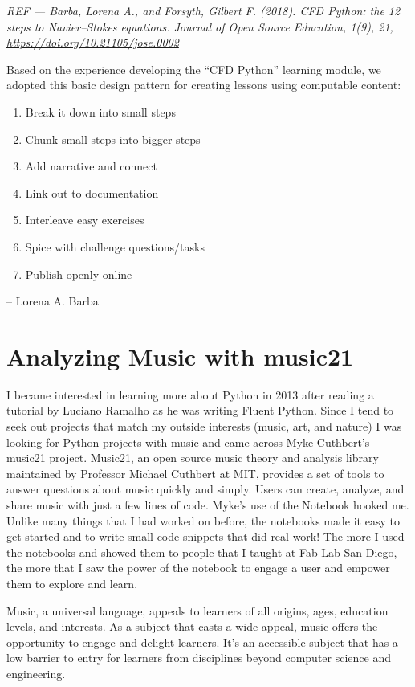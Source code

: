 \documentclass[]{book}
\providecommand{\tightlist}{%
  \setlength{\itemsep}{0pt}\setlength{\parskip}{0pt}}
\begin{document}
\emph{REF --- Barba, Lorena A., and Forsyth, Gilbert F. (2018). CFD
Python: the 12 steps to Navier--Stokes equations. Journal of Open Source
Education, 1(9), 21, \url{https://doi.org/10.21105/jose.0002} }

Based on the experience developing the ``CFD Python'' learning module,
we adopted this basic design pattern for creating lessons using
computable content:

\begin{enumerate}
\def\labelenumi{\arabic{enumi}.}
\tightlist
\item
  Break it down into small steps
\item
  Chunk small steps into bigger steps
\item
  Add narrative and connect
\item
  Link out to documentation
\item
  Interleave easy exercises
\item
  Spice with challenge questions/tasks
\item
  Publish openly online
\end{enumerate}

-- Lorena A. Barba

\section{Analyzing Music with
music21}\label{analyzing-music-with-music21}

I became interested in learning more about Python in 2013 after reading
a tutorial by Luciano Ramalho as he was writing Fluent Python. Since I
tend to seek out projects that match my outside interests (music, art,
and nature) I was looking for Python projects with music and came across
Myke Cuthbert's music21 project. Music21, an open source music theory
and analysis library maintained by Professor Michael Cuthbert at MIT,
provides a set of tools to answer questions about music quickly and
simply. Users can create, analyze, and share music with just a few lines
of code. Myke's use of the Notebook hooked me. Unlike many things that I
had worked on before, the notebooks made it easy to get started and to
write small code snippets that did real work! The more I used the
notebooks and showed them to people that I taught at Fab Lab San Diego,
the more that I saw the power of the notebook to engage a user and
empower them to explore and learn.

Music, a universal language, appeals to learners of all origins, ages,
education levels, and interests. As a subject that casts a wide appeal,
music offers the opportunity to engage and delight learners. It's an
accessible subject that has a low barrier to entry for learners from
disciplines beyond computer science and engineering.
\end{document}
